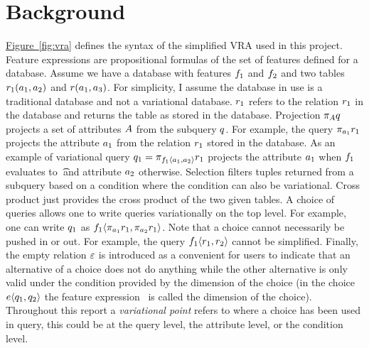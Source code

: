 \documentclass[12pt]{article}
\newcommand{\figref}[1]{\hyperref[fig:#1]{Figure~\ref*{fig:#1}}}
\begin{document}
\section{Background}
\label{sec:bg}

\figref{vra} defines the syntax of the simplified VRA used in this project.
Feature expressions are propositional formulas of the set of features defined
for a database. Assume we have a database with features $\fName_1$ and 
$\fName_2$ and two tables $\vRel_1 (\att_1, \att_2)$ and $\vRel (\att_1, \att_3)$. 
For simplicity, I assume the database in use is a traditional database and not 
a variational database. 
$\vRel_1$ refers to the relation $\vRel_1$ in the database and returns the table
as stored in the database. 
Projection $\vPrj \vQ$ projects a set of attributes $\vAttList$ from the subquery $\vQ$.
For example, the query $\vPrj [\att_1] \vRel_1$ projects the attribute $\att_1$ from the 
relation $\vRel_1$ stored in the database. As an example of variational query 
$\vQ_1 = \pi_{ \chc [\fName_1] {\att_1, \att_2}} \vRel_1$ projects the attribute $\att_1$ when
$\fName_1$ evaluates to \t\ and attribute $\att_2$ otherwise. Selection 
filters tuples returned from a subquery based on a condition where the condition can
also be variational. Cross product just provides the cross product of the 
two given tables. A choice of queries allows one to write queries variationally on
the top level. For example, one can write $\vQ_1$ as 
$\chc [\fName_1] {\vPrj [\att_1] \vRel_1, \vPrj [\att_2] \vRel_1}$. Note that a 
choice cannot necessarily be pushed in or out. For example, the query
$\chc [\fName_1] {\vRel_1, \vRel_2}$ cannot be simplified.
Finally, the empty relation $\empRel$ is introduced as a convenient for 
users to indicate that an alternative of a choice does not do anything while
the other alternative is only valid under the condition provided by the 
dimension of the choice (in the choice $\chc {\vQ_1, \vQ_2}$ the feature expression
\dimMeta\ is called the dimension of the choice).
Throughout this report a \emph{variational point} refers to where a choice
has been used in query, this could be at the query level, the attribute
level, or the condition level.
\end{document}
